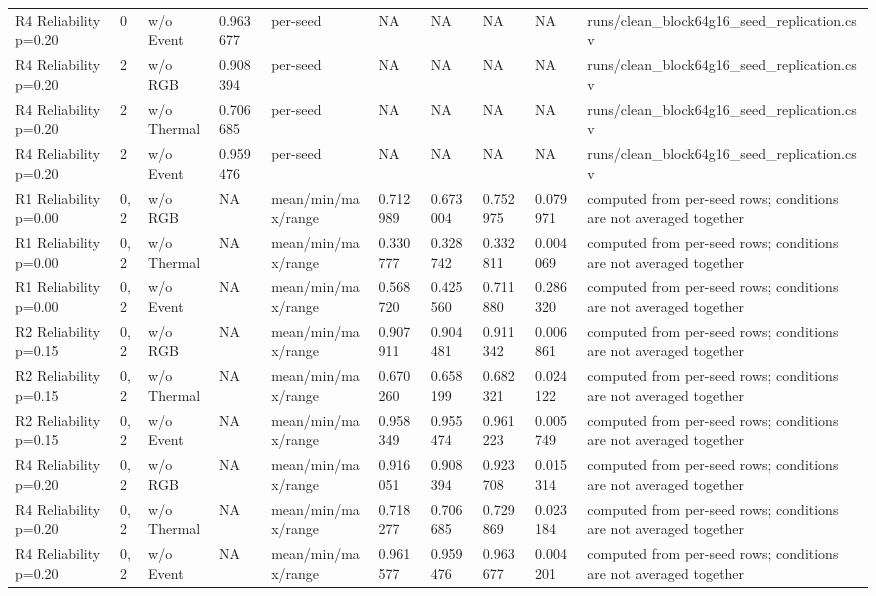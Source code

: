 {\begin{tabular}{@{}llllllllll@{}}
R4 Reliability p=0.20 & 0 & w/o Event & 0.963677 & per-seed & NA & NA & NA & NA & runs/clean\_block64g16\_seed\_replication.csv \\
R4 Reliability p=0.20 & 2 & w/o RGB & 0.908394 & per-seed & NA & NA & NA & NA & runs/clean\_block64g16\_seed\_replication.csv \\
R4 Reliability p=0.20 & 2 & w/o Thermal & 0.706685 & per-seed & NA & NA & NA & NA & runs/clean\_block64g16\_seed\_replication.csv \\
R4 Reliability p=0.20 & 2 & w/o Event & 0.959476 & per-seed & NA & NA & NA & NA & runs/clean\_block64g16\_seed\_replication.csv \\
R1 Reliability p=0.00 & 0,2 & w/o RGB & NA & mean/min/max/range & 0.712989 & 0.673004 & 0.752975 & 0.079971 & computed from per-seed rows; conditions are not averaged together \\
R1 Reliability p=0.00 & 0,2 & w/o Thermal & NA & mean/min/max/range & 0.330777 & 0.328742 & 0.332811 & 0.004069 & computed from per-seed rows; conditions are not averaged together \\
R1 Reliability p=0.00 & 0,2 & w/o Event & NA & mean/min/max/range & 0.568720 & 0.425560 & 0.711880 & 0.286320 & computed from per-seed rows; conditions are not averaged together \\
R2 Reliability p=0.15 & 0,2 & w/o RGB & NA & mean/min/max/range & 0.907911 & 0.904481 & 0.911342 & 0.006861 & computed from per-seed rows; conditions are not averaged together \\
R2 Reliability p=0.15 & 0,2 & w/o Thermal & NA & mean/min/max/range & 0.670260 & 0.658199 & 0.682321 & 0.024122 & computed from per-seed rows; conditions are not averaged together \\
R2 Reliability p=0.15 & 0,2 & w/o Event & NA & mean/min/max/range & 0.958349 & 0.955474 & 0.961223 & 0.005749 & computed from per-seed rows; conditions are not averaged together \\
R4 Reliability p=0.20 & 0,2 & w/o RGB & NA & mean/min/max/range & 0.916051 & 0.908394 & 0.923708 & 0.015314 & computed from per-seed rows; conditions are not averaged together \\
R4 Reliability p=0.20 & 0,2 & w/o Thermal & NA & mean/min/max/range & 0.718277 & 0.706685 & 0.729869 & 0.023184 & computed from per-seed rows; conditions are not averaged together \\
R4 Reliability p=0.20 & 0,2 & w/o Event & NA & mean/min/max/range & 0.961577 & 0.959476 & 0.963677 & 0.004201 & computed from per-seed rows; conditions are not averaged together \\
\bottomrule
\end{tabular}%
}
